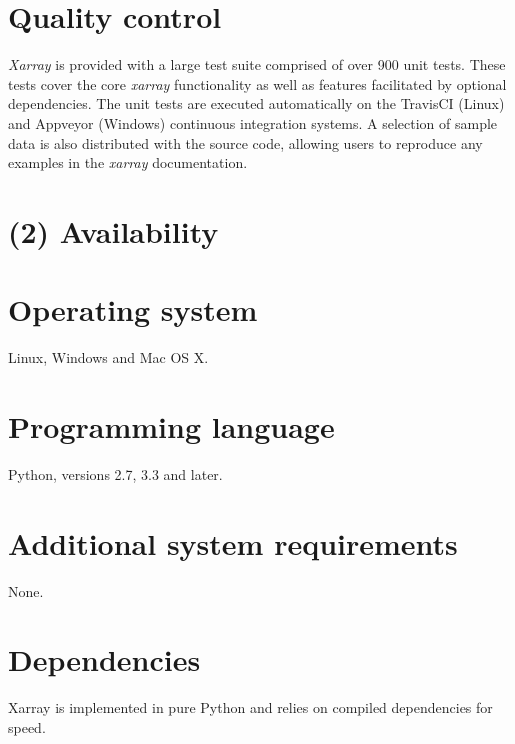 \documentclass{jors}
\begin{document}
\section*{Quality control}


\textit{Xarray} is provided with a large test suite comprised of over 900 unit tests.
These tests cover the core \textit{xarray} functionality as well as features facilitated by optional dependencies.
The unit tests are executed automatically on the TravisCI (Linux) \citep{TravisCI} and Appveyor (Windows) \citep{Appveyor} continuous integration systems.
A selection of sample data is also distributed with the source code, allowing users to reproduce any examples in the \textit{xarray} documentation.

\section*{(2) Availability}
\vspace{0.5cm}
\section*{Operating system}

Linux, Windows and Mac OS X.

\section*{Programming language}

Python, versions 2.7, 3.3 and later.

\section*{Additional system requirements}

None.

\section*{Dependencies}

Xarray is implemented in pure Python and relies on compiled dependencies for
speed.
\end{document}
